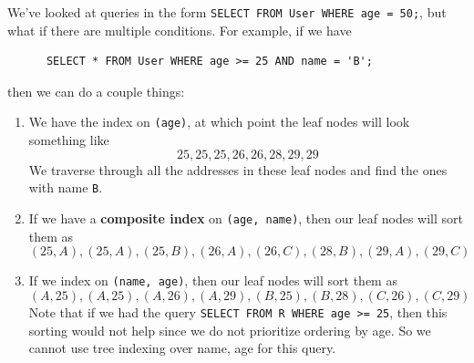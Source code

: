   \begin{definition}
    \label{def:composite-index}
    We've looked at queries in the form \texttt{SELECT \* FROM User WHERE age = 50;}, but what if there are multiple conditions. For example, if we have 
    \begin{lstlisting}
      SELECT * FROM User WHERE age >= 25 AND name = 'B'; 
    \end{lstlisting}
    then we can do a couple things: 
    \begin{enumerate}
      \item We have the index on \texttt{(age)}, at which point the leaf nodes will look something like 
        \begin{equation}
          25, 25, 25, 26, 26, 28, 29, 29
        \end{equation}
        We traverse through all the addresses in these leaf nodes and find the ones with name \texttt{B}. 

      \item If we have a \textbf{composite index} on \texttt{(age, name)}, then our leaf nodes will sort them as 
        \begin{equation}
          (25, A), (25, A), (25, B), (26, A), (26, C), (28, B), (29, A), (29, C)
        \end{equation}

      \item If we index on \texttt{(name, age)}, then our leaf nodes will sort them as 
        \begin{equation}
          (A, 25), (A, 25), (A, 26), (A, 29), (B, 25), (B, 28), (C, 26), (C, 29)
        \end{equation}
        Note that if we had the query \texttt{SELECT \* FROM R WHERE age >= 25}, then this sorting would not help since we do not prioritize ordering by age. So we cannot use tree indexing over name, age for this query. 
    \end{enumerate}
  \end{definition}

